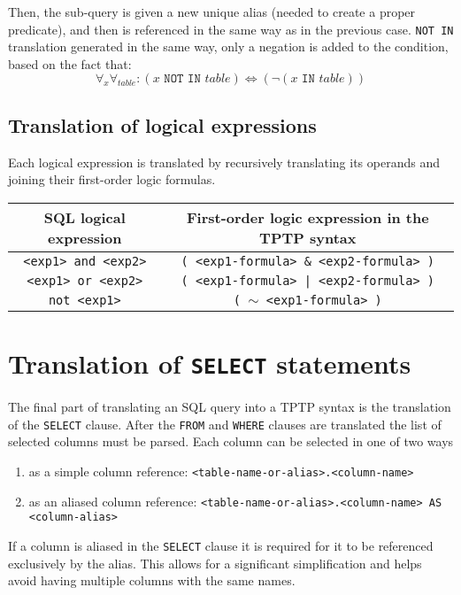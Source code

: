 \documentclass[magisterska,en]{pracamgr}
\newcommand{\code}[1]{\texttt{#1}}
\begin{document}
Then, the sub-query is given a new unique alias (needed to create a proper predicate), and then is referenced in the same way as in the previous case. \code{NOT IN} translation generated in the same way, only a negation is added to the condition, based on the fact that:
$$
\forall_x \forall_{table} : (x \code{ NOT IN } table) \iff (\neg (x \code{ IN } table))
$$






\subsection{Translation of logical expressions}

Each logical expression is translated by recursively translating its operands and joining their first-order logic formulas.

\renewcommand{\arraystretch}{1.5}
\begin{center}
 \begin{tabular}{ c | c }
 SQL logical expression & First-order logic expression in the TPTP syntax \\
 \hline
 \code{<exp1> and <exp2>} & \code{( <exp1-formula> \& <exp2-formula> )} \\
 \code{<exp1> or <exp2>} & \code{( <exp1-formula> | <exp2-formula> )} \\
 \code{not <exp1>} & \code{( $\sim$ <exp1-formula> )}
\end{tabular}
\end{center}




\section{Translation of \code{SELECT} statements}

The final part of translating an SQL query into a TPTP syntax is the translation of the \code{SELECT} clause. After the \code{FROM} and \code{WHERE} clauses are translated the list of selected columns must be parsed. Each column can be selected in one of two ways
\begin{enumerate}
    \item as a simple column reference: \code{<table-name-or-alias>.<column-name>}
    \item as an aliased column reference: \code{<table-name-or-alias>.<column-name> AS <column-alias>}
\end{enumerate}
If a column is aliased in the \code{SELECT} clause it is required for it to be referenced exclusively by the alias. This allows for a significant simplification and helps avoid having multiple columns with the same names.
\end{document}
